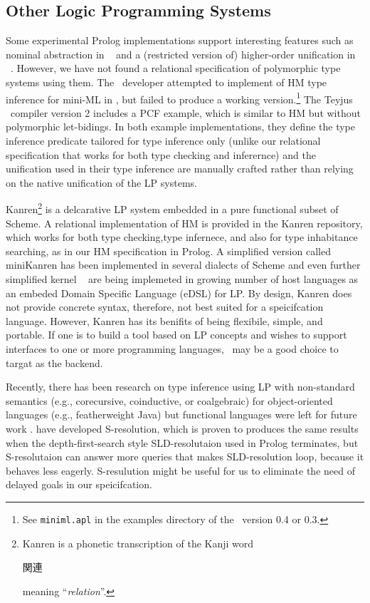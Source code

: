 \subsection{Other Logic Programming Systems}\label{ssec:otherLP}
Some experimental Prolog implementations support interesting features such as
nominal abstraction in \aProlog\ \cite{cheney04iclp} and a (restricted version
of) higher-order unification in \lProlog\ \cite{nadathur99cade}. However, we
have not found a relational specification of polymorphic type systems using
them. The \aProlog\ developer attempted to implement of HM type inference for
mini-ML in \aProlog, but failed to produce a working version.\footnote{
	See \texttt{miniml.apl} in the examples directory of
	the \aProlog\ version 0.4 or 0.3.}
The Teyjus \lProlog\ compiler version 2 includes a PCF example,
which is similar to HM but without polymorphic let-bidings.
In both example implementations, they define the type inference predicate
tailored for type inference only (unlike our relational specification that
works for both type checking and inferernce) and the unification used in
their type inference are manually crafted rather than relying on
the native unification of the LP systems.

Kanren\footnote{ Kanren is a phonetic transcription of the Kanji word
	\begin{CJK}{UTF8}{min}{関連}\end{CJK} meaning ``\emph{relation}''.}
is a delcarative LP system embedded in a pure functional subset of Scheme.
A relational implementation of HM is provided in
the Kanren repository,
which works for both type checking,type infernece, and also for
type inhabitance searching, as in our HM specification in Prolog.
A simplified version called miniKanren
has been implemented in several dialects of Scheme and even further simplified
kernel \muKanren\ \cite{microKanren} are being implemeted in growing number of
host languages as an embeded Domain Specific Language (eDSL) for LP.
By design, Kanren does not provide concrete syntax, therefore, not best suited
for a speicifcation language. However, Kanren has its benifits of being
flexibile, simple, and portable. If one is to build a tool based on LP concepts
and wishes to support interfaces to one or more programming languages,
\muKanren\ may be a good choice to targat as the backend.

Recently, there has been research on type inference using LP with non-standard
semantics (e.g., corecursive, coinductive, or coalgebraic) for object-oriented
languages (e.g., featherweight Java) but functional languages were left for
future work \cite{AL-ECOOP09}.
\citet{SRLP15} have developed S-resolution, which is proven \cite{PCR15} to
produces the same results when the depth-first-search style SLD-resolutaion
used in Prolog terminates, but S-resolutaion can answer more
queries that makes SLD-resolution loop, because it behaves less eagerly.
S-resulution might be useful for us to eliminate the need of delayed goals
in our speicifcation.

